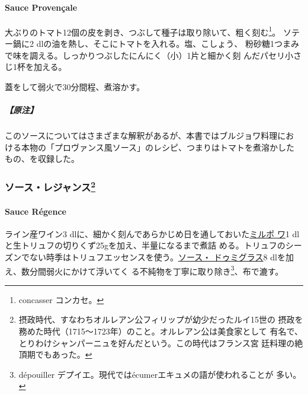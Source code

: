 \begin{recette}
\hypertarget{sauce-provencal}{%
\paragraph{Sauce Provençale}\label{sauce-provencal}}

 

大ぶりのトマト12個の皮を剥き、つぶして種子は取り除いて、粗く刻む\footnote{concasser
  コンカセ。}。 ソテー鍋に2\undemi{}
dlの油を熱し、そこにトマトを入れる。塩、こしょう、
粉砂糖1つまみで味を調える。しっかりつぶしたにんにく（小）1片と細かく刻
んだパセリ小さじ1杯を加える。

蓋をして弱火で30分間程、煮溶かす。

\hypertarget{ux539fux6ce8-7}{%
\subparagraph{【原注】}\label{ux539fux6ce8-7}}

このソースについてはさまざまな解釈があるが、本書ではブルジョワ料理にお
ける本物の「プロヴァンス風ソース」のレシピ、つまりはトマトを煮溶かした
もの、を収録した。

\maeaki

\hypertarget{ux30bdux30fcux30b9ux30ecux30b8ux30e3ux30f3ux30b975}{%
\subsubsection[ソース・レジャンス]{\texorpdfstring{ソース・レジャンス\footnote{摂政時代、すなわちオルレアン公フィリップが幼少だったルイ15世の
  摂政を務めた時代（1715〜1723年）のこと。オルレアン公は美食家として
  有名で、とりわけシャンパーニュを好んだという。この時代はフランス宮
  廷料理の絶頂期でもあった。}}{ソース・レジャンス}}\label{ux30bdux30fcux30b9ux30ecux30b8ux30e3ux30f3ux30b975}}

\hypertarget{sauce-regence}{%
\paragraph{Sauce Régence}\label{sauce-regence}}

  

ライン産ワイン3
dlに、細かく刻んであらかじめ日を通しておいた\protect\hyperlink{mirepoix}{ミルポ
ワ}1 dlと生トリュフの切りくず25gを加え、半量になるまで煮詰
める。トリュフのシーズンでない時季はトリュフエッセンスを使う。\protect\hyperlink{sauce-demi-glace}{ソース・
ドゥミグラス}8 dlを加え、数分間弱火にかけて浮いてく
る不純物を丁寧に取り除き\footnote{dépouiller
  デプイエ。現代ではécumerエキュメの語が使われることが 多い。}、布で漉す。


\end{recette}
